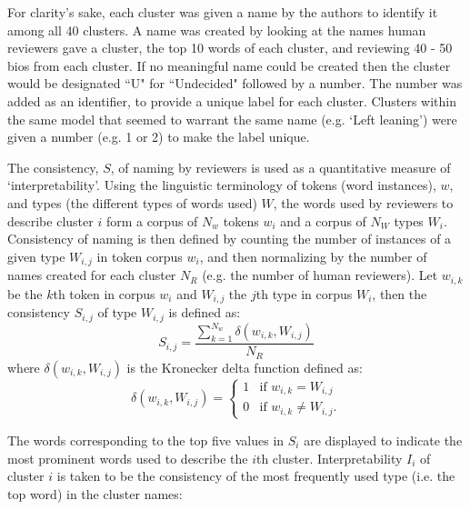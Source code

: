 \documentclass{article}
\begin{document}
For clarity's sake, each cluster was given a name by the authors to identify it among all 40 clusters. A name was created by looking at the names human reviewers gave a cluster, the top 10 words of each cluster, and reviewing 40 - 50 bios from each cluster.  If no meaningful name could be created then the cluster would be designated ``U" for ``Undecided" followed by a number.  The number was added as an identifier, to provide a unique label for each cluster. Clusters within the same model that seemed to warrant the same name (e.g. `Left leaning') were given a number (e.g. 1 or 2) to make the label unique. 


The consistency, $S$, of naming by reviewers is used as a quantitative measure of `interpretability'.  
Using the linguistic terminology of tokens (word instances), $w$, and types (the different types of words used) $W$, 
the words used by reviewers to describe cluster $i$ form a corpus of $N_w$ tokens $w_i$ and a corpus of $N_W$ types $W_i$. 
Consistency of naming is then defined by counting the number of instances of a given type $W_{i,j}$ in token corpus $w_i$, 
and then normalizing by the number of names created for each cluster $N_R$ (e.g. the number of human reviewers). 
Let $w_{i,k}$ be the $k$th token in corpus $w_i$ and $W_{i,j}$ the $j$th type in corpus $W_i$, then the consistency $S_{i,j}$ of type $W_{i,j}$ is defined as:
\begin{equation}
{S_{i,j} = \frac{\sum_{k=1}^{N_w} \delta(w_{i,k},W_{i,j})}{N_R}}
\label{eq:consistency}
\end{equation}
{where $\delta(w_{i,k},W_{i,j})$ is the Kronecker delta function defined as:}
\begin{equation*}
{\delta(w_{i,k},W_{i,j}) = 
\begin{cases} 
1 & \text{if } w_{i,k} = W_{i,j} \\ 
0 & \text{if } w_{i,k} \neq W_{i,j}. 
\end{cases}
}
\end{equation*}



The words corresponding to the top five values in $S_i$ are displayed to indicate the most prominent words used to describe the $i$th cluster.  
Interpretability $I_i$ of cluster $i$ is taken to be the consistency of the most frequently used type (i.e. the top word) in the cluster names:
\end{document}
